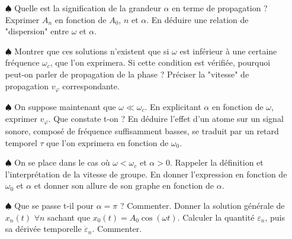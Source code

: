 \documentclass{report}
\begin{document}
\begin{itemize}

	\item[$\spadesuit$] Quelle est la signification de la grandeur $\alpha$ en terme de propagation ? Exprimer $A_n$ en fonction de $A_0$, $n$ et $\alpha$. En déduire une relation de "dispersion" entre $\omega$ et $\alpha$.

	\item[$\spadesuit$] Montrer que ces solutions n'existent que si $\omega$ est inférieur à une certaine fréquence $\omega_c$, que l'on exprimera. Si cette condition est vérifiée, pourquoi peut-on parler de propagation de la phase ? Préciser la "vitesse" de propagation $v_\varphi$ correspondante.
	
	\item[$\spadesuit$] On suppose maintenant que $\omega\ll\omega_c$. En explicitant $\alpha$ en fonction de $\omega$, exprimer $v_\varphi$. Que constate t-on ? En déduire l'effet d'un atome sur un signal sonore, composé de fréquence suffisamment basses, se traduit par un retard temporel $\tau$ que l'on exprimera en fonction de $\omega_0$. 

	\item[$\spadesuit$] On se place dans le cas où $\omega<\omega_c$ et $\alpha>0$. Rappeler la définition et l'interprétation de la vitesse de groupe. En donner l'expression en fonction de $\omega_0$ et $\alpha$ et donner son allure de son graphe en fonction de $\alpha$. 
	
	\item[$\spadesuit$] Que se passe t-il pour $\alpha=\pi$ ? Commenter. Donner la solution générale de $x_n(t)$ $\forall n$ sachant que $x_0(t)=A_0\cos(\omega t)$. Calculer la quantité $\varepsilon_n$, puis sa dérivée temporelle $\dot{\varepsilon}_n$. Commenter.
	
\end{itemize}
\end{document}
